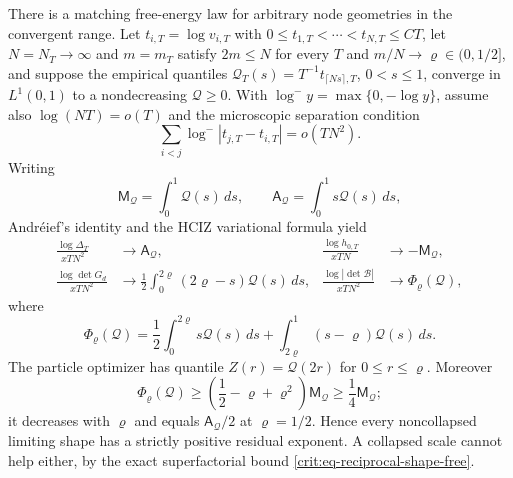 \documentclass[11pt,oneside]{article}
\theoremstyle{definition}
\theoremstyle{remark}
\begin{document}
There is a matching free-energy law for arbitrary node geometries in the convergent range.
Let $t_{i,T}=\log v_{i,T}$ with $0\le t_{1,T}<\cdots<t_{N,T}\le CT$, let
$N=N_T\to\infty$ and $m=m_T$ satisfy $2m\le N$ for every $T$ and
$m/N\to\varrho\in(0,1/2]$, and suppose the empirical quantiles
$\mathcal Q_T(s)=T^{-1}t_{\lceil Ns\rceil,T}$, $0<s\le1$, converge in $L^1(0,1)$ to a nondecreasing
$\mathcal Q\ge0$.  With $\log^-y=\max\{0,-\log y\}$, assume also $\log(NT)=o(T)$ and the
microscopic separation condition
\[
 \sum_{i<j}\log^-|t_{j,T}-t_{i,T}|=o(TN^2).
\]
Writing
\[
 \mathsf M_{\mathcal Q}=\int_0^1\mathcal Q(s)\,ds,\qquad
 \mathsf A_{\mathcal Q}=\int_0^1s\mathcal Q(s)\,ds,
\]
Andr\'eief's identity and the HCIZ variational formula yield
\begin{align}
 \frac{\log\Delta_T}{xTN^2}&\longrightarrow\mathsf A_{\mathcal Q},
 &\frac{\log h_{0,T}}{xTN}&\longrightarrow-\mathsf M_{\mathcal Q},\nonumber\\
 \frac{\log\det G_d}{xTN^2}&\longrightarrow
 \frac12\int_0^{2\varrho}(2\varrho-s)\mathcal Q(s)\,ds,
 &\frac{\log|\det\mathcal B|}{xTN^2}&\longrightarrow
 \Phi_{\varrho}(\mathcal Q),
 \label{crit:eq-reciprocal-quantile-law}
\end{align}
where
\begin{equation}
 \Phi_{\varrho}(\mathcal Q)
 =\frac12\int_0^{2\varrho}s\mathcal Q(s)\,ds
  +\int_{2\varrho}^1(s-\varrho)\mathcal Q(s)\,ds.
 \label{crit:eq-reciprocal-quantile-functional}
\end{equation}
The particle optimizer has quantile $Z(r)=\mathcal Q(2r)$ for
$0\le r\le\varrho$.  Moreover
\begin{equation}
 \Phi_{\varrho}(\mathcal Q)
 \ge\left(\frac12-\varrho+\varrho^2\right)\mathsf M_{\mathcal Q}
 \ge\frac14\mathsf M_{\mathcal Q};
 \label{crit:eq-reciprocal-quantile-positive}
\end{equation}
it decreases with $\varrho$ and equals $\mathsf A_{\mathcal Q}/2$ at
$\varrho=1/2$.  Hence every noncollapsed limiting shape has a strictly positive residual
exponent.  A collapsed scale cannot help either, by the exact superfactorial bound
\eqref{crit:eq-reciprocal-shape-free}.
\end{document}
